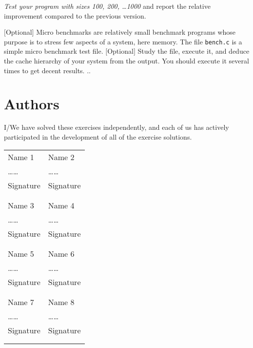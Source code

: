 \documentclass{article}
\begin{document}
\begin{ExerciseList}
\Question
\emph{Test your program with sizes 100, 200, \dots 1000} and report
the relative improvement compared to the previous version.
\Answer %

\Exercise $[$Optional$]$ Micro benchmarks are relatively small
benchmark programs whose purpose is to stress few aspects of a
system, here memory. The file \texttt{bench.c} is a simple micro
benchmark test file.
\Question $[$Optional$]$
Study the file, execute it, and deduce the cache hierarchy of your
system from the output. You should execute it several times to get
decent results.
\Answer .. %

\end{ExerciseList}

\newpage
\section{Authors}
I/We have solved these exercises independently, and each of us has actively
participated in the development of all of the exercise solutions.
\vspace{1cm}

\noindent
\begin{tabular}{p{70mm}p{70mm}}

%
%

Name 1 & Name 2 \\
\dots\dotfill\dots & \dots\dotfill\dots \\
Signature & Signature \\
& \\
& \\

Name 3 & Name 4 \\
\dots\dotfill\dots & \dots\dotfill\dots \\
Signature & Signature \\
& \\
& \\

Name 5 & Name 6 \\
\dots\dotfill\dots & \dots\dotfill\dots \\
Signature & Signature \\
& \\
& \\

Name 7 & Name 8 \\
\dots\dotfill\dots & \dots\dotfill\dots \\
Signature & Signature \\
& \\
& \\
\end{tabular}
\end{document}
